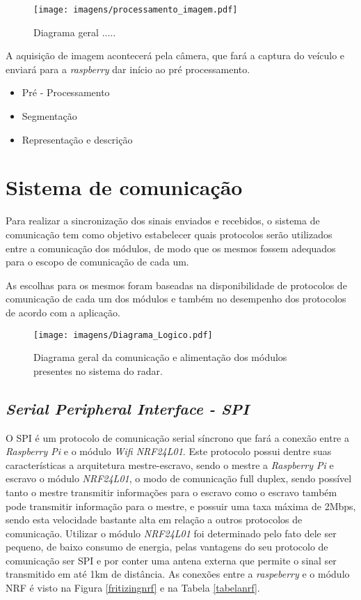 \begin{figure}[H]
    \centering
    \texttt{[image: imagens/processamento\_imagem.pdf]}
    \caption{Diagrama geral .....}
    \label{processamento}
\end{figure}

   A aquisição de imagem acontecerá pela câmera, que fará a captura do veículo e enviará para a \emph{raspberry} dar início ao pré processamento.  
   
\begin{itemize}
    \item Pré - Processamento
    \item Segmentação
    \item Representação e descrição
\end{itemize}



\section{Sistema de comunicação}
Para realizar a sincronização dos sinais enviados e recebidos, o sistema de comunicação tem como objetivo estabelecer quais protocolos serão utilizados entre a comunicação dos módulos, de modo que os mesmos fossem adequados para o escopo de comunicação de cada um.

As escolhas para os mesmos foram baseadas na disponibilidade de protocolos de comunicação de cada um dos módulos e também no desempenho dos protocolos de acordo com a aplicação.


\begin{figure}[H]
    \centering
    \texttt{[image: imagens/Diagrama\_Logico.pdf]}
    \caption{Diagrama geral da comunicação e alimentação dos módulos presentes no sistema do radar. }
    \label{diagrama_logico}
\end{figure}



\subsection{\emph{Serial Peripheral Interface - SPI}}
    O SPI é um protocolo de comunicação serial síncrono que fará a conexão entre a \emph{Raspberry Pi} e o módulo \emph{Wifi NRF24L01}. Este protocolo possui dentre suas características a arquitetura mestre-escravo, sendo o mestre a \emph{Raspberry Pi} e escravo o módulo \emph{NRF24L01}, o modo de comunicação full duplex, sendo possível tanto o mestre transmitir informações para o escravo como o escravo também pode transmitir informação para o mestre, e possuir uma taxa máxima de 2Mbps, sendo esta velocidade bastante alta em relação a outros protocolos de comunicação.
    Utilizar o módulo \emph{NRF24L01} foi determinado pelo fato dele ser pequeno, de baixo consumo de energia, pelas vantagens do seu protocolo de comunicação ser SPI e por conter uma antena externa que permite o sinal ser transmitido em até 1km de distância.
    As conexões entre a \emph{raspeberry} e o módulo NRF é visto na Figura \ref{fritizingnrf} e na Tabela \ref{tabelanrf}.
    
